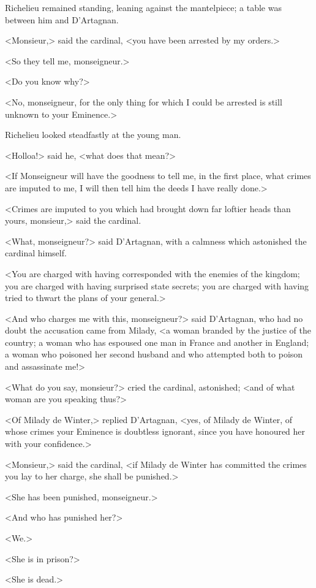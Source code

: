 Richelieu remained standing, leaning against the mantelpiece; a table was between him and D'Artagnan. 

<Monsieur,> said the cardinal, <you have been arrested by my orders.> 

<So they tell me, monseigneur.> 

<Do you know why?> 

<No, monseigneur, for the only thing for which I could be arrested is still unknown to your Eminence.> 

Richelieu looked steadfastly at the young man. 

<Holloa!> said he, <what does that mean?> 

<If Monseigneur will have the goodness to tell me, in the first place, what crimes are imputed to me, I will then tell him the deeds I have really done.> 

<Crimes are imputed to you which had brought down far loftier heads than yours, monsieur,> said the cardinal. 

<What, monseigneur?> said D'Artagnan, with a calmness which astonished the cardinal himself. 

<You are charged with having corresponded with the enemies of the kingdom; you are charged with having surprised state secrets; you are charged with having tried to thwart the plans of your general.> 

<And who charges me with this, monseigneur?> said D'Artagnan, who had no doubt the accusation came from Milady, <a woman branded by the justice of the country; a woman who has espoused one man in France and another in England; a woman who poisoned her second husband and who attempted both to poison and assassinate me!> 

<What do you say, monsieur?> cried the cardinal, astonished; <and of what woman are you speaking thus?> 

<Of Milady de Winter,> replied D'Artagnan, <yes, of Milady de Winter, of whose crimes your Eminence is doubtless ignorant, since you have honoured her with your confidence.> 

<Monsieur,> said the cardinal, <if Milady de Winter has committed the crimes you lay to her charge, she shall be punished.> 

<She has been punished, monseigneur.> 

<And who has punished her?> 

<We.> 

<She is in prison?> 

<She is dead.> 

